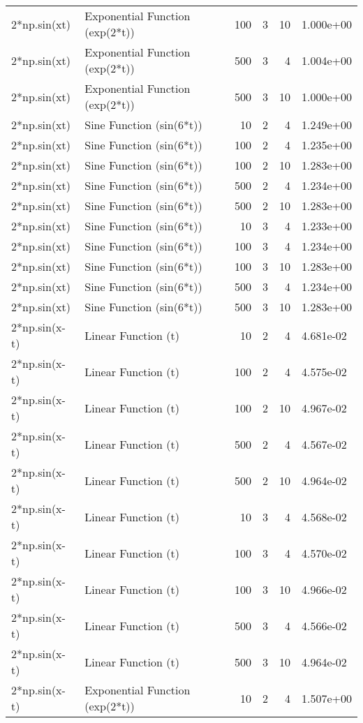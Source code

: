 \begin{tabular}{llrrrl}
2*np.sin(xt) & Exponential Function (exp(2*t)) & 100 & 3 & 10 & 1.000e+00 \\
2*np.sin(xt) & Exponential Function (exp(2*t)) & 500 & 3 & 4 & 1.004e+00 \\
2*np.sin(xt) & Exponential Function (exp(2*t)) & 500 & 3 & 10 & 1.000e+00 \\
2*np.sin(xt) & Sine Function (sin(6*t)) & 10 & 2 & 4 & 1.249e+00 \\
2*np.sin(xt) & Sine Function (sin(6*t)) & 100 & 2 & 4 & 1.235e+00 \\
2*np.sin(xt) & Sine Function (sin(6*t)) & 100 & 2 & 10 & 1.283e+00 \\
2*np.sin(xt) & Sine Function (sin(6*t)) & 500 & 2 & 4 & 1.234e+00 \\
2*np.sin(xt) & Sine Function (sin(6*t)) & 500 & 2 & 10 & 1.283e+00 \\
2*np.sin(xt) & Sine Function (sin(6*t)) & 10 & 3 & 4 & 1.233e+00 \\
2*np.sin(xt) & Sine Function (sin(6*t)) & 100 & 3 & 4 & 1.234e+00 \\
2*np.sin(xt) & Sine Function (sin(6*t)) & 100 & 3 & 10 & 1.283e+00 \\
2*np.sin(xt) & Sine Function (sin(6*t)) & 500 & 3 & 4 & 1.234e+00 \\
2*np.sin(xt) & Sine Function (sin(6*t)) & 500 & 3 & 10 & 1.283e+00 \\
2*np.sin(x-t) & Linear Function (t) & 10 & 2 & 4 & 4.681e-02 \\
2*np.sin(x-t) & Linear Function (t) & 100 & 2 & 4 & 4.575e-02 \\
2*np.sin(x-t) & Linear Function (t) & 100 & 2 & 10 & 4.967e-02 \\
2*np.sin(x-t) & Linear Function (t) & 500 & 2 & 4 & 4.567e-02 \\
2*np.sin(x-t) & Linear Function (t) & 500 & 2 & 10 & 4.964e-02 \\
2*np.sin(x-t) & Linear Function (t) & 10 & 3 & 4 & 4.568e-02 \\
2*np.sin(x-t) & Linear Function (t) & 100 & 3 & 4 & 4.570e-02 \\
2*np.sin(x-t) & Linear Function (t) & 100 & 3 & 10 & 4.966e-02 \\
2*np.sin(x-t) & Linear Function (t) & 500 & 3 & 4 & 4.566e-02 \\
2*np.sin(x-t) & Linear Function (t) & 500 & 3 & 10 & 4.964e-02 \\
2*np.sin(x-t) & Exponential Function (exp(2*t)) & 10 & 2 & 4 & 1.507e+00 \\

\end{tabular}
